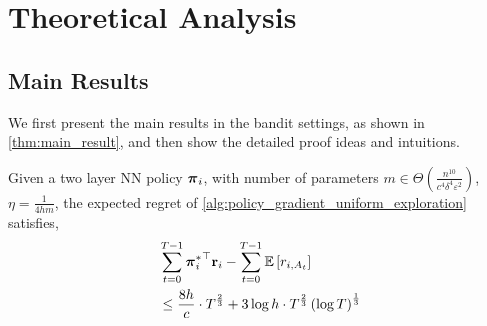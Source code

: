 \section{Theoretical Analysis}
\label{sec:theoretical_analysis}

\subsection{Main Results}
\label{subsec:main_results}

We first present the main results in the bandit settings, as shown in \cref{thm:main_result}, and then show the detailed proof ideas and  intuitions.

\begin{thm}
\label{thm:main_result}
    Given a two layer NN policy ${\boldsymbol{\pi}}_i$, with number of parameters $m \in \Theta\left( \frac{n^{10}}{c^4 \delta^4 \varepsilon^2} \right)$, $\eta = \frac{1}{4 h m}$, the expected regret of \cref{alg:policy_gradient_uniform_exploration} satisfies,
\begin{equation*}
\begin{split}
    &\sum\limits_{t=0}^{T-1}{ {{\boldsymbol{\pi}}_i^*}^\top {\mathbf{r}}_i } - \sum\limits_{t=0}^{T-1}{ {\mathbb{E}} \left[ r_{i, A_t} \right] } \\
    &\le \frac{8 h}{c} \cdot T^{\frac{2}{3}} + 3 \log{h} \cdot T^{\frac{2}{3}} \left(\log{T}\right)^{\frac{1}{3}}
\end{split}
\end{equation*}
\end{thm}
